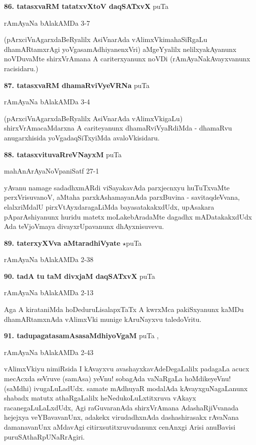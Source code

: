 \medskip
\noindent\textbf{86. tatasxvaRM tatatxvXtoV daqSATxvX} \hfill puTa \pageref{149}

\hfill rAmAyaNa bAlakAMDa 3-7

(pArxciVnAgarxdaBeRyalilx AsiVnarAda vAlimxVkimahaSiRgaLu dhamARtamxrAgi yoVgasamAdhiyanenxVri) aMgeYyalilx nelilxyakAyanunx noVDuvaMte shirxVrAmana A cariterxyanunx noVDi (rAmAyaNakAvayxvanunx racisidaru.)

\medskip
\noindent\textbf{87. tatasxvaRM dhamaRviVyeVRNa} \hfill puTa \pageref{210c}

\hfill rAmAyaNa bAlakAMDa 3-4

(pArxciVnAgarxdaBeRyalilx AsiVnarAda vAlimxVkigaLu) shirxVrAmacaMdarxna A cariteyanunx dhamaRviVyaRdiMda - dhamaRvu anugarxhisida yoVgadaqSiTxyiMda avaloVkisidaru.

\medskip
\noindent\textbf{88. tatasxvituvaRreVNayxM} \hfill puTa \pageref{186}

\hfill mahAnArAyaNoVpaniSatf 27-1

yAvanu namage sadadhxmARdi viSayakavAda parxjecnxyu huTuTxvaMte perxVrisuvanoV, aMtaha parxkAshamayanAda parxBuvina - savitaqdeVvana, elalxriMdalU pirxVtAyxdaragaLiMda bayasatakakxdUdx, upAsakara pAparAshiyanunx huridu matetx moLakebAradaMte dagadhx mADatakakxdUdx Ada teVjoVmaya divayxrUpavanunx dhAyxnisuvevu.

\medskip
\noindent\textbf{89. taterxyXVva aMtaradhiVyate} $\star$\hfill puTa \pageref{181a}

\hfill rAmAyaNa bAlakAMDa 2-38

\medskip
\noindent\textbf{90. tadA tu taM divxjaM daqSATxvX} \hfill puTa \pageref{199}

\hfill rAmAyaNa bAlakAMDa 2-13

Aga A kirataniMda hoDeduruLisalapxTaTx A kwrxMca pakiSxyanunx kaMDu dhamARtamxnAda vAlimxVki munige kAruNayxvu taledoVritu.

\medskip
\noindent\textbf{91. tadupagatasamAsasaMdhiyoVgaM} \hfill puTa \pageref{152a},\pageref{212}

\hfill rAmAyaNa bAlakAMDa 2-43

vAlimxVkiyu nimiRsida I kAvayxvu avashayxkavAdeDegaLalilx padagaLa acucx mecAcxda seVruve (samAsa) yeVnu! sobagAda vaNaRgaLa hoMdikeyeVnu! (saMdhi) ivugaLuLadUdx.  samate mAdhuyaR modalAda kAvayxguNagaLanunx shabadx matutx athaRgaLalilx heNedukoLuLxtitxruva vAkayx racanegaLuLaLxdUdx, Agi raGuvaranAda shirxVrAmana AdashaRjiVvanada hejejxya veYBavavanUnx, adakekx virudadhxnAda dashashirasakx rAvaNana damanavanUnx aMdavAgi citirxsutitxruvudanunx cenAnxgi Arisi anuBavisi puruSAthaRpUNaRrAgiri.

